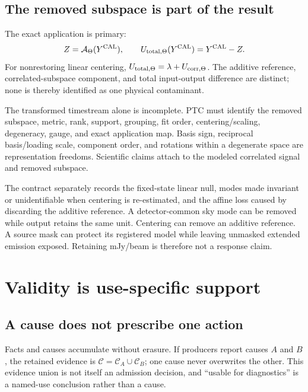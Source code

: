 \documentclass[11pt]{article}
\begin{document}
\subsection{The removed subspace is part of the result}

The exact application is primary:
\[
Z=\mathcal A_\Theta(Y^{\rm CAL}),\qquad
U_{{\rm total},\Theta}(Y^{\rm CAL})=Y^{\rm CAL}-Z.
\]
For nonrestoring linear centering,
$U_{{\rm total},\Theta}=\lambda+U_{{\rm corr},\Theta}$. The additive reference,
correlated-subspace component, and total input-output difference are distinct;
none is thereby identified as one physical contaminant.

The transformed timestream alone is incomplete. PTC must identify the removed
subspace, metric, rank, support, grouping, fit order, centering/scaling,
degeneracy, gauge, and exact application map. Basis sign, reciprocal
basis/loading scale, component order, and rotations within a degenerate space
are representation freedoms. Scientific claims attach to the modeled
correlated signal and removed subspace.

The contract separately records the fixed-state linear null, modes made
invariant or unidentifiable when centering is re-estimated, and the affine
loss caused by discarding the additive reference. A detector-common sky mode
can be removed while output retains the same unit. Centering can remove an
additive reference. A source mask can
protect its registered model while leaving unmasked extended emission
exposed. Retaining mJy/beam is therefore not a response claim.

\section{Validity is use-specific support}
\label{sec:science-support}

\subsection{A cause does not prescribe one action}

Facts and causes accumulate without erasure. If producers report causes
$A$ and $B$, the retained evidence is $\mathcal C=\mathcal C_A\cup
\mathcal C_B$; one cause never overwrites the other. This evidence union is
not itself an admission decision, and ``usable for diagnostics'' is a
named-use conclusion rather than a cause.
\end{document}
